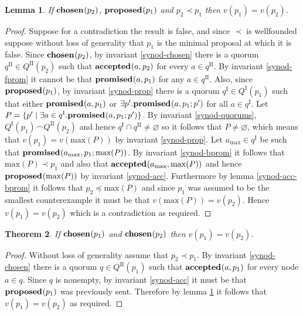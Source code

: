 \documentclass[journal]{IEEEtran}
\newtheorem{theorem}{Theorem}
\newtheorem{lemma}[theorem]{Lemma}
\begin{document}
\begin{lemma}\label{synod-lemma} If $\mathbf{chosen}_{}(p_2)$, $\mathbf{proposed}_{}(p_1)$ and $p_2
\prec p_1$ then $v(p_1) = v(p_2)$. \end{lemma}

\begin{proof}Suppose for a contradiction the result is false, and since $\prec$
is wellfounded suppose without loss of generality that $p_1$ is the minimal
proposal at which it is false.  Since $\mathbf{chosen}_{}(p_2)$, by invariant
\ref{synod-chosen} there is a quorum $q^\textrm{II} \in Q^\textrm{II}(p_2)$
such that $\mathbf{accepted}_{}(a,p_2)$ for every $a \in q^\textrm{II}$.  By invariant
\ref{synod-fprom} it cannot be that $\mathbf{promised}_{}(a,p_1)$ for any $a \in
q^\textrm{II}$.  Also, since $\mathbf{proposed}_{}(p_1)$, by invariant \ref{synod-prop}
there is a quorum $q^\textrm{I} \in Q^\textrm{I}(p_1)$ such that either
$\mathbf{promised}_{}(a,p_1)$ or $\exists p'.  \mathbf{promised}_{}(a,p_1;p')$ for all $a \in
q^\textrm{I}$.  Let $P = \{ p' \mid \exists a \in q^\textrm{I}.
\mathbf{promised}_{}(a,p_1;p') \}$.  By invariant \ref{synod-quorums},
${Q^\textrm{I}(p_1) \frown Q^\textrm{II}(p_2)}$ and hence $q^\textrm{I} \cap
q^\textrm{II} \ne \varnothing$ so it follows that $P \ne \varnothing$, which
means that $v(p_1) = v(\mathrm{max}(P))$ by invariant \ref{synod-prop}. Let
$a_{\mathrm{max}} \in q^\textrm{I}$ be such that
$\mathbf{promised}_{}(a_{\mathrm{max}},p_1;\mathrm{max}(P))$.  By invariant
\ref{synod-bprom} it follows that $\mathrm{max}(P) \prec p_1$ and also that
$\mathbf{accepted}_{}(a_{\mathrm{max}},\mathrm{max}(P))$ and hence
$\mathbf{proposed}_{}(\mathrm{max}(P))$ by invariant \ref{synod-acc}. Furthermore by lemma
\ref{synod-acc-bprom} it follows that $p_2 \preceq \mathrm{max}(P)$ and since
$p_1$ was assumed to be the smallest counterexample it must be that
$v(\mathrm{max}(P)) = v(p_2)$.  Hence $v(p_1) = v(p_2)$ which is a
contradiction as required.  \end{proof}

\begin{theorem}\label{synod-safety-theorem} If $\mathbf{chosen}_{}(p_1)$ and
$\mathbf{chosen}_{}(p_2)$ then $v(p_1) = v(p_2)$.  \end{theorem}

\begin{proof} Without loss of generality assume that ${p_2 \prec p_1}$. By
invariant \ref{synod-chosen} there is a quorum $q \in Q^\textrm{II}(p_1)$ such
that $\mathbf{accepted}_{}(a,p_1)$ for every node $a \in q$. Since $q$ is nonempty, by
invariant \ref{synod-acc} it must be that $\mathbf{proposed}_{}(p_1)$ was previously sent.
Therefore by lemma \ref{synod-lemma} it follows that $v(p_1) = v(p_2)$ as
required.  \end{proof}
\end{document}
